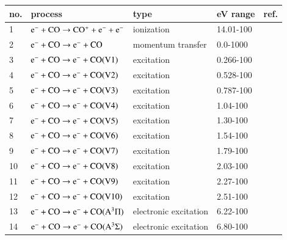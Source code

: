 \begin{table}[!htbp]
  \center{}
  \begin{threeparttable}
    \label{tab:tableCO}
    \begin{tabular*}{\textwidth}{l@{\extracolsep{\fill}}llll}
    \toprule
    {no.}  & {process} & {type} &  {eV range}  &  {ref.} \\
    \midrule
      1 & $\rm e^- + CO \rightarrow CO^+ + e^- + e^-$  &  ionization   &  14.01-100 &   \cite{lxc:2024:morgan} \\ 
      \midrule     
      2 & $\rm e^- + CO \rightarrow e^- + CO$  &  momentum transfer   &  0.0-1000 & \cite{lxc:2024:morgan}\\   
      \midrule
       3 & $\rm e^- + CO \rightarrow e^- + CO(V1)$  &   excitation   &  0.266-100 & \cite{lxc:2024:morgan}\\ 
      4 & $\rm e^- + CO \rightarrow e^- + CO(V2)$  &   excitation   &  0.528-100 & \cite{lxc:2024:morgan}\\ 
      5 & $\rm e^- + CO \rightarrow e^- + CO(V3)$  &   excitation   &  0.787-100 & \cite{lxc:2024:morgan}\\ 
      6 & $\rm e^- + CO \rightarrow e^- + CO(V4)$  &   excitation   &  1.04-100 & \cite{lxc:2024:morgan}\\ 
      7 & $\rm e^- + CO \rightarrow e^- + CO(V5)$  &   excitation   &  1.30-100 & \cite{lxc:2024:morgan}\\ 
      8 & $\rm e^- + CO \rightarrow e^- + CO(V6)$  &   excitation   &  1.54-100 & \cite{lxc:2024:morgan}\\ 
      9 & $\rm e^- + CO \rightarrow e^- + CO(V7)$  &   excitation   &  1.79-100 & \cite{lxc:2024:morgan}\\ 
      10 & $\rm e^- + CO \rightarrow e^- + CO(V8)$  &   excitation   &  2.03-100 & \cite{lxc:2024:morgan}\\ 
      11 & $\rm e^- + CO \rightarrow e^- + CO(V9)$  &   excitation   &  2.27-100 & \cite{lxc:2024:morgan}\\ 
      12 & $\rm e^- + CO \rightarrow e^- + CO(V10)$  &   excitation   &  2.51-100 & \cite{lxc:2024:morgan}\\ 
      13 & $\rm e^- + CO \rightarrow e^- + CO(A^3\Pi)$  &   electronic excitation   &  6.22-100 & \cite{lxc:2024:morgan}\\ 
      14 & $\rm e^- + CO \rightarrow e^- + CO(A^3\Sigma)$  &   electronic excitation   &  6.80-100 & \cite{lxc:2024:morgan}\\ 

\end{tabular*}
\end{threeparttable}
\end{table}
